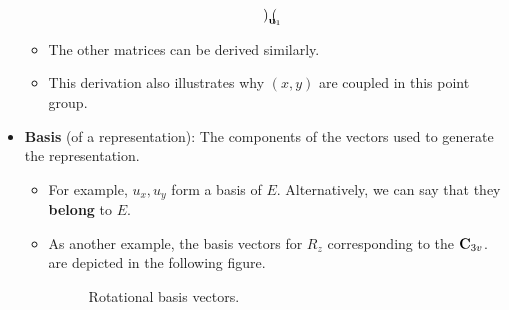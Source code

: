 \documentclass[../notes.tex]{subfiles}
\begin{document}
\begin{itemize}
\begin{itemize}
\begin{align*}
{\begin{pmatrix}
                \end{pmatrix}
            }_{\mathbf{u}_1}
        \end{align*}
        \item The other matrices can be derived similarly.
        \item This derivation also illustrates why $(x,y)$ are coupled in this point group.
    \end{itemize}
    \item \textbf{Basis} (of a representation): The components of the vectors used to generate the representation.
    \begin{itemize}
        \item For example, $u_x,u_y$ form a basis of $E$. Alternatively, we can say that they \textbf{belong} to $E$.
        \item As another example, the basis vectors for $R_z$ corresponding to the $\mathbf{C}_{3v}$. are depicted in the following figure.
        \begin{figure}[h!]
            \centering
            \caption{Rotational basis vectors.}
            \label{fig:rotationalBasis}
        \end{figure}
    \end{itemize}
\end{itemize}
\end{document}
